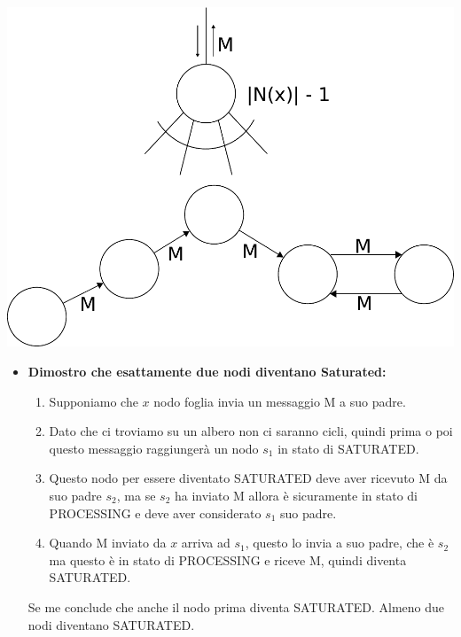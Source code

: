 {  \begin{center}
    \includegraphics[scale=0.5]{images/n_40}
  \end{center}
\begin{itemize}
    \item \textbf{Dimostro che esattamente due nodi diventano Saturated:}
    \begin{enumerate}
        \item Supponiamo che $x$ nodo foglia invia un messaggio M a suo padre.
        \item Dato che ci troviamo su un albero non ci saranno cicli, quindi prima o poi questo messaggio raggiungerà un nodo $s_1$ in stato di SATURATED.
        \item 
        
        Questo nodo per essere diventato SATURATED deve aver ricevuto M da suo padre $s_2$, ma se $s_2$ ha inviato M allora è sicuramente in stato di PROCESSING e deve aver considerato $s_1$ suo padre.
        \item Quando M inviato da $x$ arriva ad $s_1$, questo lo invia a suo padre, che è $s_2$ ma questo è in stato di PROCESSING e riceve M, quindi diventa SATURATED.%
    \end{enumerate}
    
    
    Se me conclude che anche il nodo prima diventa SATURATED. Almeno due nodi diventano SATURATED.
    

\end{itemize}}

